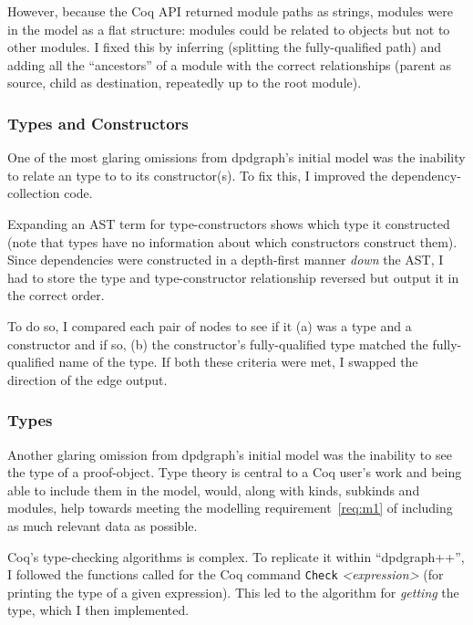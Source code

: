 However, because the Coq API returned module paths as strings, modules were in
the model as a flat structure: modules could be related to objects but not to
other modules. I fixed this by inferring (splitting the fully-qualified path)
and adding all the ``ancestors'' of a module with the correct relationships
(parent as source, child as destination, repeatedly up to the root module).

\subsubsection{Types and Constructors}\label{subsubsec:typecon}

One of the most glaring omissions from dpdgraph's initial model was the
inability to relate an type to to its constructor(s). To fix this,
I improved the dependency-collection code.

Expanding an AST term for type-constructors shows which type it constructed
(note that types have no information about which constructors construct them).
Since dependencies were constructed in a depth-first manner \emph{down} the AST,
I had to store the type and type-constructor relationship reversed but output it
in the correct order.

To do so, I compared each pair of nodes to see if it (a) was a type and a
constructor and if so, (b) the constructor's fully-qualified type matched the
fully-qualified name of the type. If both these criteria were met, I swapped the
direction of the edge output.

\subsubsection{Types}


Another glaring omission from dpdgraph's initial model was the inability to see
the type of a proof-object. Type theory is central to a Coq user's work and
being able to include them in the model, would, along with kinds, subkinds and
modules, help towards meeting the modelling requirement~\ref{req:m1} of
including as much relevant data as possible. 

Coq's type-checking algorithms is complex. To replicate it within
``dpdgraph++'', I followed the functions called for the Coq command
\texttt{Check} \emph{<expression>} (for printing the type of a given
expression).  This led to the algorithm for \emph{getting} the type, which I
then implemented.

